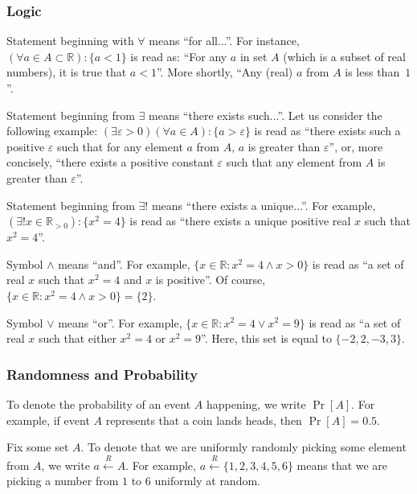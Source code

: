 \documentclass[../lecture-notes.tex]{subfiles}
\begin{document}
\vspace{-2mm}

\subsubsection{Logic}

Statement beginning with $\forall$ means ``for all...''. For instance, $(\forall a \in A \subset \mathbb{R}): \{a < 1\}$ is read as: ``For any $a$ in set $A$ (which is a subset of real numbers), it is true that $a<1$''. More shortly, ``Any (real) $a$ from $A$ is less than~$1$''.

Statement beginning from $\exists$ means ``there exists such...''. Let us consider the following example: $(\exists \varepsilon > 0) (\forall a \in A): \{a > \varepsilon\}$ is read as ``there exists such a positive $\varepsilon$ such that for any element $a$ from $A$, $a$ is greater than $\varepsilon$'', or, more concisely, ``there exists a positive constant $\varepsilon$ such that any element from $A$ is greater than $\varepsilon$''.

Statement beginning from $\exists !$ means ``there exists a unique...''. For example, $(\exists! x \in \mathbb{R}_{>0}): \{x^2 = 4\}$ is read as ``there exists a unique positive real $x$ such that $x^2 = 4$''.

Symbol $\wedge$ means ``and''. For example, $\{x \in \mathbb{R}: x^2 = 4 \wedge x > 0\}$ is read as ``a set of real $x$ such that $x^2=4$ and $x$ is positive''. Of course, $\{x \in \mathbb{R}: x^2 = 4 \wedge x > 0\} = \{2\}$.

Symbol $\vee$ means ``or''. For example, $\{x \in \mathbb{R}: x^2 = 4 \vee x^2 = 9\}$ is read as ``a set of real $x$ such that either $x^2=4$ or $x^2=9$''. Here, this set is equal to $\{-2,2,-3,3\}$.

\subsubsection{Randomness and Probability}

To denote the probability of an event $A$ happening, we write $\Pr[A]$. For example, if event $A$ represents that a coin lands heads, then $\Pr[A] = 0.5$.

Fix some set $A$. To denote that we are uniformly randomly picking some element from $A$, we write $a \xleftarrow{R} A$. For example, $a \xleftarrow{R} \{1,2,3,4,5,6\}$ means that we are picking a number from $1$ to $6$ uniformly at random.
\end{document}
